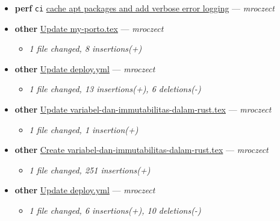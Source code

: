 \begin{itemize}[leftmargin=1.5em]
  \begin{itemize}[leftmargin=1.5em]
    \item \small\textit{1 file changed, 98 insertions(+), 17 deletions(-)}
  \end{itemize}
  \item \textbf{perf} \texttt{ci} \href{https://github.com/mroczect/mroczect.github.io/commit/23e2a0c6d8d632975d117c27cb943ea154051f7e}{cache apt packages and add verbose error logging} --- \textit{mroczect}
  \item \textbf{other} \href{https://github.com/mroczect/mroczect.github.io/commit/2535114daa15d3d719fe582c628a9c70118e5ce5}{Update my-porto.tex} --- \textit{mroczect}
  \begin{itemize}[leftmargin=1.5em]
    \item \small\textit{1 file changed, 8 insertions(+)}
  \end{itemize}
  \item \textbf{other} \href{https://github.com/mroczect/mroczect.github.io/commit/319219e2a2bf5179649d195664cbeab40ece99a4}{Update deploy.yml} --- \textit{mroczect}
  \begin{itemize}[leftmargin=1.5em]
    \item \small\textit{1 file changed, 13 insertions(+), 6 deletions(-)}
  \end{itemize}
  \item \textbf{other} \href{https://github.com/mroczect/mroczect.github.io/commit/fbb0a594498735fbed5d02f297ff947ce2b4e882}{Update variabel-dan-immutabilitas-dalam-rust.tex} --- \textit{mroczect}
  \begin{itemize}[leftmargin=1.5em]
    \item \small\textit{1 file changed, 1 insertion(+)}
  \end{itemize}
  \item \textbf{other} \href{https://github.com/mroczect/mroczect.github.io/commit/040a1b07b5ccda3566e0865a0220cd167bcf8fae}{Create variabel-dan-immutabilitas-dalam-rust.tex} --- \textit{mroczect}
  \begin{itemize}[leftmargin=1.5em]
    \item \small\textit{1 file changed, 251 insertions(+)}
  \end{itemize}
  \item \textbf{other} \href{https://github.com/mroczect/mroczect.github.io/commit/5001264280378d2297c4a85e6482cfaf24061093}{Update deploy.yml} --- \textit{mroczect}
  \begin{itemize}[leftmargin=1.5em]
    \item \small\textit{1 file changed, 6 insertions(+), 10 deletions(-)}

\end{itemize}
\end{itemize}
